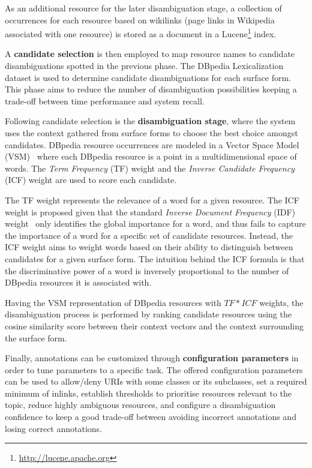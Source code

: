 As an additional resource for the later disambiguation stage, a collection of occurrences for 
each resource based on wikilinks (page links in Wikipedia associated with one resource) is 
stored as a document in a Lucene\footnote{\url{http://lucene.apache.org}} index.

A \textbf{candidate selection} is then employed to map resource names to candidate 
disambiguations spotted in the previous phase. The DBpedia Lexicalization dataset is used to 
determine candidate disambiguations for each surface form. This phase aims to reduce the 
number of disambiguation possibilities keeping a trade-off between time performance and 
system recall. 

Following candidate selection is the \textbf{disambiguation stage}, where the system uses 
the context gathered from surface forms to choose the best choice amongst candidates. 
DBpedia resource occurrences are modeled in a Vector Space Model (VSM)~\cite{infExtr:SaltonWY75} 
where each DBpedia resource is a point in a multidimensional space of words. The \textit{Term 
Frequency} (TF) weight and the \textit{Inverse Candidate Frequency} (ICF) weight are 
used to score each candidate. 

The TF weight represents the relevance of a word for a given resource. The ICF weight is 
proposed given that the standard \textit{Inverse Document Frequency} (IDF) 
weight~\cite{infExtr:Jones04} only identifies the global importance for a word, and thus 
fails to capture the importance of a word for a specific set of candidate resources. Instead, 
the ICF weight aims to weight words based on their ability to distinguish between candidates 
for a given surface form. The intuition behind the ICF formula is that the discriminative power 
of a word is inversely proportional to the number of DBpedia resources it is associated with. 

Having the VSM representation of DBpedia resources with $TF \ast ICF$ weights, the 
disambiguation process is performed by ranking candidate resources using the cosine 
similarity score between their context vectors and the context surrounding the surface form.

Finally, annotations can be customized through \textbf{configuration parameters} in order to 
tune parameters to a specific task. The offered configuration parameters can be used to 
allow/deny URIs with some classes or its subclasses, set a required minimum of inlinks, 
establish thresholds to prioritise resources relevant to the topic, reduce highly ambiguous 
resources, and configure a disambiguation confidence to keep a good trade-off between avoiding 
incorrect annotations and losing correct annotations.

